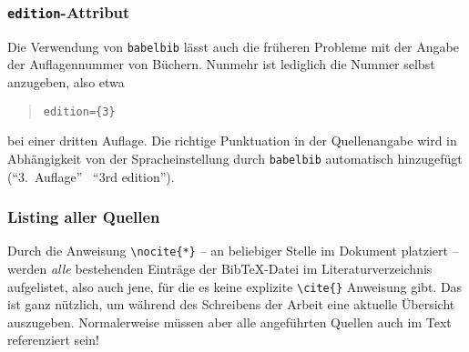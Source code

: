 \subsubsection{\texttt{edition}-Attribut}

Die Verwendung von \verb!babelbib! lässt auch die früheren Probleme mit der
Angabe der Auflagennummer von Büchern. Nunmehr ist lediglich die Nummer selbst anzugeben, also etwa
\begin{quote}
\verb!edition={3}!
\end{quote}
bei einer dritten Auflage. Die richtige Punktuation in der Quellenangabe wird in Abhängigkeit von der Spracheinstellung durch \texttt{babelbib} automatisch hinzugefügt ("`3.\ Auflage"' \bzw\ "`3rd edition"').


\subsubsection{Listing aller Quellen}

Durch die Anweisung \verb!\nocite{*}! -- an beliebiger Stelle im Dokument platziert -- werden \emph{alle} bestehenden Einträge der BibTeX-Datei im Literaturverzeichnis aufgelistet, also auch jene, für die es keine explizite \verb!\cite{}! Anweisung gibt. Das ist ganz nützlich, um während des Schreibens der Arbeit eine aktuelle Übersicht auszugeben. Normalerweise müssen aber alle angeführten Quellen auch im Text referenziert sein!
